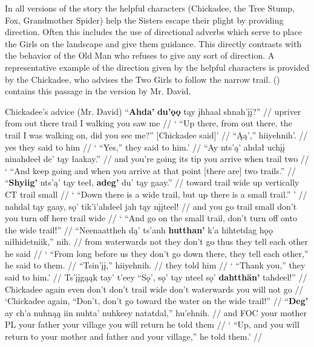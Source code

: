 In all versions of the story the helpful characters (Chickadee, the Tree Stump, Fox, Grandmother Spider) help the Sisters escape their plight by providing direction. Often this includes the use of directional adverbs which serve to place the Girls on the landscape and give them guidance. This directly contrasts with the behavior of the Old Man who refuses to give any sort of direction. A representative example of the direction given by the helpful characters is provided by the Chickadee, who advises the Two Girls to follow the narrow trail. () contains this passage in the version by Mr. David.

\pex Chickadee's advice (Mr. David) 
\a
\begingl
\gla ``\textbf{Ahda'} \textbf{du'ǫǫ} tąy įhhaal shnah'įį?''  //
\glb upriver {from out there} trail {I walking} {you saw me} //
\glft ` ``Up there, from out there, the trail I was walking on, did you see me?'' [Chickadee said]' //
\endgl
\a
\begingl
\gla ``Ąą','' hiiyehnih'.  //
\glb yes {they said to him} //
\glft ` ``Yes,'' they said to him.' //
\endgl
\a
\begingl
\gla ``{Ay nts'ą'} ahdał uchįį ninahdeeł de' tąy łaakay.''  //
\glb and {you're going} {its tip} {you arrive} when trail two //
\glft ` ``And keep going and when you arrive at that point [there are] two trails.'' //
\endgl
\a
\begingl
\gla ``\textbf{Shyiig'} nts'ą' tąy teeł, \textbf{adeg'} du' tąy gaay.''  //
 toward trail wide {up vertically} CT trail small //
\glft ` ``Down there is a wide trail, but up there is a small trail.'' ' //
\endgl
\a
\begingl
{} nahdal tąy gaay, sǫ' tik'i'ahdeel jah tąy nįįteel!  //
\glb and {you go} trail small don't {you turn off} here trail wide //
\glft ` ``And go on the small trail, don't turn off onto the wide trail!'' //
\endgl
\a
\begingl
\gla ``{Neenaattheh dą'} ts'anh \textbf{hutthan'} k'a hihtetdag hǫǫ niłhidetniik,'' nih.  //
 from waterwards not {they don't go} thus {they tell each other} {he said} //
\glft ` ``From long before us they don't go down there, they tell each other,'' he said to them. //
\endgl
\a
\begingl
\gla ``Tsin'įį,'' hiiyehnih.  //
 {they told him} //
\glft ` ``Thank you,'' they said to him.' //
\endgl
\a
\begingl
\gla Ts'įįgąąk tay' t'eey ``Sǫ', sǫ' tąy nteel sǫ' \textbf{dahtthän'} tahdeel!''  //
\glb Chickadee again even don't don't trail wide don't waterwards {you will not go} //
\glft `Chickadee again, ``Don't, don't go toward the water on the wide trail!'' //
\endgl
\a
\begingl
\gla ``\textbf{Deg'} ay ch'a nuhnąą iin nuhta' nuhkeey natatdal,'' hu'ehnih.  //
 and FOC {your mother} PL {your father} {your village} {you will return} {he told them} //
\glft ` ``Up, and you will return to your mother and father and your village,'' he told them.' //
\endgl
\xe

